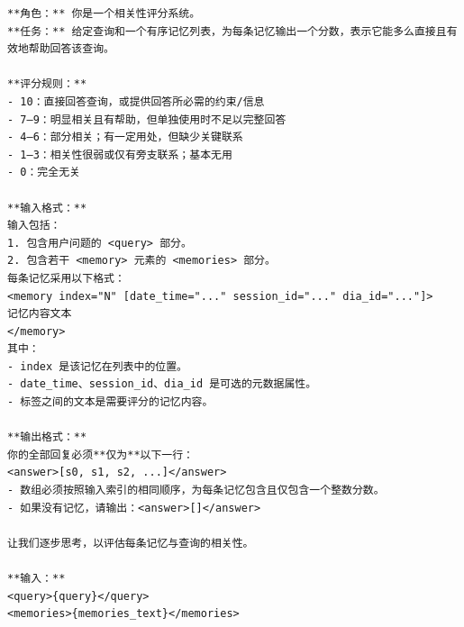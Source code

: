 \begin{center}
\begin{tcolorbox}[title={过滤模块提示词（中）}]
{
\begin{Verbatim}[breaklines, breakanywhere, fontfamily=tt, fontseries=b, baselinestretch=0.95]
**角色：** 你是一个相关性评分系统。
**任务：** 给定查询和一个有序记忆列表，为每条记忆输出一个分数，表示它能多么直接且有效地帮助回答该查询。

**评分规则：**
- 10：直接回答查询，或提供回答所必需的约束/信息
- 7–9：明显相关且有帮助，但单独使用时不足以完整回答
- 4–6：部分相关；有一定用处，但缺少关键联系
- 1–3：相关性很弱或仅有旁支联系；基本无用
- 0：完全无关

**输入格式：**
输入包括：
1. 包含用户问题的 <query> 部分。
2. 包含若干 <memory> 元素的 <memories> 部分。
每条记忆采用以下格式：
<memory index="N" [date_time="..." session_id="..." dia_id="..."]>
记忆内容文本
</memory>
其中：
- index 是该记忆在列表中的位置。
- date_time、session_id、dia_id 是可选的元数据属性。
- 标签之间的文本是需要评分的记忆内容。

**输出格式：**
你的全部回复必须**仅为**以下一行：
<answer>[s0, s1, s2, ...]</answer>
- 数组必须按照输入索引的相同顺序，为每条记忆包含且仅包含一个整数分数。
- 如果没有记忆，请输出：<answer>[]</answer>

让我们逐步思考，以评估每条记忆与查询的相关性。

**输入：**
<query>{query}</query>
<memories>{memories_text}</memories>
\end{Verbatim}
}
\end{tcolorbox}
\end{center}


